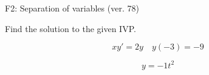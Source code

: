 \begin{exercise}
  \begin{exerciseTitle}F2: Separation of variables (ver. 78)\end{exerciseTitle}
  \begin{exerciseStatement}
    
Find the solution to the given IVP.

    
\[xy'= 2 y \hspace{1em} y( -3 ) = -9\]

  \end{exerciseStatement}
  \begin{exerciseAnswer}
    
\[y= -1 t^ 2\]

  \end{exerciseAnswer}
\end{exercise}